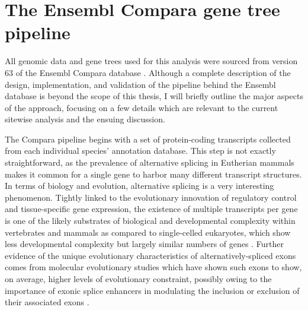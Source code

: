 \section{The Ensembl Compara gene tree pipeline}

All genomic data and gene trees used for this analysis were sourced
from version 63 of the Ensembl Compara database \citep{TODO, Ensembl
  2010 and EnsemblCompara GeneTrees}. Although a complete description
of the design, implementation, and validation of the pipeline behind
the Ensembl database is beyond the scope of this thesis, I will
briefly outline the major aspects of the approach, focusing on a few
details which are relevant to the current sitewise analysis and the
ensuing discussion.

The Compara pipeline begins with a set of protein-coding transcripts
collected from each individual species' annotation database. This step
is not exactly straightforward, as the prevalence of alternative
splicing in Eutherian mammals makes it common for a single gene to
harbor many different transcript structures. In terms of biology and
evolution, alternative splicing is a very interesting
phenomenon. Tightly linked to the evolutionary innovation of
regulatory control and tissue-specific gene expression, the existence
of multiple transcripts per gene is one of the likely substrates of
biological and developmental complexity within vertebrates and mammals
as compared to single-celled eukaryotes, which show less developmental
complexity but largely similar numbers of genes \citep{TODO}. Further
evidence of the unique evolutionary characteristics of
alternatively-spliced exons comes from molecular evolutionary studies
which have shown such exons to show, on average, higher levels of
evolutionary constraint, possibly owing to the importance of exonic
splice enhancers in modulating the inclusion or exclusion of their
associated exons \citep{TODO}.

